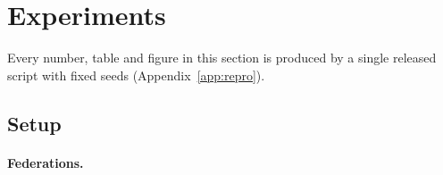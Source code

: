 \section{Experiments}
\label{sec:experiments}

Every number, table and figure in this section is produced by a single released script with
fixed seeds (Appendix~\ref{app:repro}).

\subsection{Setup}
\label{sec:exp_setup}

\paragraph{Federations.}
